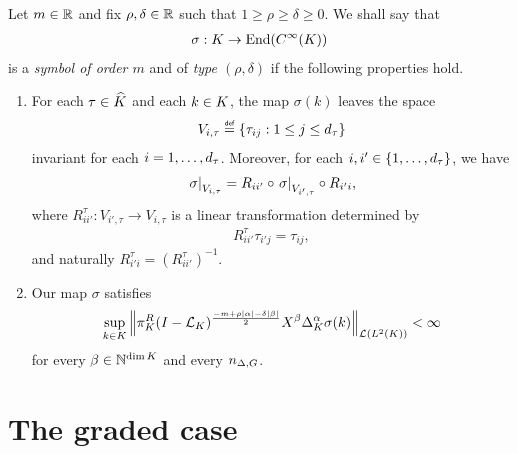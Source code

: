 \begin{definition}
    Let $m \in \mathbb{R}$ and fix $\rho, \delta \in \mathbb{R}$ such that $1 \geq \rho \geq \delta \geq 0$.
    We shall say that
    \begin{align*}
        \sigma : K \to \operatorname{End}({C^\infty(K)})
    \end{align*}
    is a \emph{symbol of order $m$} and of \emph{type $(\rho, \delta)$}
    if the following properties hold.
    \begin{enumerate}
        \item
            For each $\tau \in {\widehat{K}}$ and each $k \in K$,
            the map $\sigma(k)$ leaves the space
            \begin{align*}
                V_{i, \tau} \defeq \{\tau_{ij} : 1 \leq j \leq \dimRep \tau\}
            \end{align*}
            invariant for each $i = 1, \dots, {d_{\tau}}$.
            Moreover, for each $i, i' \in \{1, \dots, {d_{\tau}}\}$,
            we have
            \begin{align*}
                \left. \sigma \right|_{V_{i, \tau}} = R_{i i'} \circ \left. \sigma \right|_{V_{i', \tau}} \circ R_{i' i},
            \end{align*}
            where $R^\tau_{i i'} : V_{i', \tau} \to V_{i, \tau}$ is a linear transformation determined by
            \begin{align*}
                R^\tau_{i i'} \tau_{i' j} = \tau_{i j},
            \end{align*}
            and naturally $R^\tau_{i' i} = (R^\tau_{i i'})^{-1}$.
        \item Our map $\sigma$ satisfies
            \begin{align*}
                \sup_{k \in \CompactGroup}
                \norm [\Lin {\Lebesgue 2 \CompactGroup}] {%
                    \RightRegularRepresentation \BesselPotential [\CompactGroup] {-m + \rho \abs \alpha - \delta \abs \beta}
                    \LeftDifferentialOperator \beta \DifferenceOperatorOrder [\CompactGroup] \alpha \sigma(k)
                } < \infty
            \end{align*}
            for every $\beta \in \mathbb{N}^{\dim K}$ and every $n_{\Delta, G}$.
    \end{enumerate}
\end{definition}

\section{The graded case}

